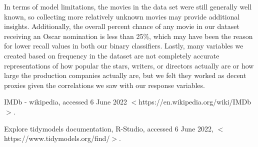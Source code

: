 \documentclass[10pt]{article}
\begin{document}
In terms of model limitations, the movies in the data set were still generally well known, so collecting more relatively unknown movies may provide additional insights. Additionally, the overall percent chance of any movie in our dataset receiving an Oscar nomination is less than 25\%, which may have been the reason for lower recall values in both our binary classifiers. Lastly, many variables we created based on frequency in the dataset are not completely accurate representations of how popular the stars, writers, or directors actually are or how large the production companies actually are, but we felt they worked as decent proxies given the correlations we saw with our response variables.


\newpage{}

\begin{thebibliography}{9}
IMDb - wikipedia, accessed 6 June 2022 $<$https://en.wikipedia.org/wiki/IMDb$>$.

Explore tidymodels documentation, R-Studio, accessed 6 June 2022, $<$https://www.tidymodels.org/find/$>$.

\end{thebibliography}


 
\end{document}
